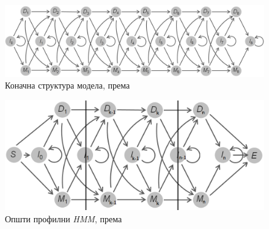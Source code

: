 \documentclass[12pt,oneside]{memoir}
\begin{document}
\begin{CJK}{UTF8}{ipxm}
\begin{figure}[!ht]
  \centering
  \includegraphics[width=\textwidth]{indeli.png}
  \caption{Коначна структура модела, према \cite{compeau2015}}
  \label{fig:indeli}
\end{figure}

\begin{figure}[!ht]
  \centering
  \includegraphics[width=\textwidth]{prof_hmm.png}
  \caption{Општи профилни \textit{HMM}, према \cite{compeau2015}}
  \label{fig:prof_hmm}
\end{figure}


\end{CJK}
\end{document}
